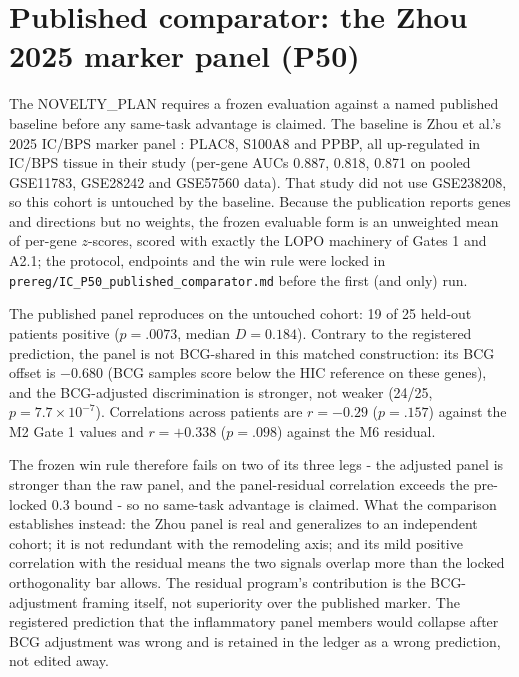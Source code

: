 \documentclass[11pt,a4paper]{article}
\begin{document}
\section{Published comparator: the Zhou 2025 marker panel (P50)}
The NOVELTY\_PLAN requires a frozen evaluation against a named published
baseline before any same-task advantage is claimed. The baseline is Zhou et
al.'s 2025 IC/BPS marker panel \cite{zhou2025}: PLAC8, S100A8 and PPBP, all
up-regulated in IC/BPS tissue in their study (per-gene AUCs 0.887, 0.818,
0.871 on pooled GSE11783, GSE28242 and GSE57560 data). That study did not use
GSE238208, so this cohort is untouched by the baseline. Because the
publication reports genes and directions but no weights, the frozen evaluable
form is an unweighted mean of per-gene $z$-scores, scored with exactly the
LOPO machinery of Gates 1 and A2.1; the protocol, endpoints and the win rule
were locked in \texttt{prereg/IC\_P50\_published\_comparator.md} before the
first (and only) run.

The published panel reproduces on the untouched cohort: 19 of 25 held-out
patients positive ($p=.0073$, median $D=0.184$). Contrary to the registered
prediction, the panel is not BCG-shared in this matched construction: its BCG
offset is $-0.680$ (BCG samples score below the HIC reference on these genes),
and the BCG-adjusted discrimination is stronger, not weaker (24/25,
$p=7.7\times10^{-7}$). Correlations across patients are $r=-0.29$
($p=.157$) against the M2 Gate 1 values and $r=+0.338$ ($p=.098$) against the
M6 residual.

The frozen win rule therefore fails on two of its three legs - the adjusted
panel is stronger than the raw panel, and the panel-residual correlation
exceeds the pre-locked 0.3 bound - so no same-task advantage is claimed. What
the comparison establishes instead: the Zhou panel is real and generalizes to
an independent cohort; it is not redundant with the remodeling axis; and its
mild positive correlation with the residual means the two signals overlap
more than the locked orthogonality bar allows. The residual program's
contribution is the BCG-adjustment framing itself, not superiority over the
published marker. The registered prediction that the inflammatory panel
members would collapse after BCG adjustment was wrong and is retained in the
ledger as a wrong prediction, not edited away.
\end{document}
